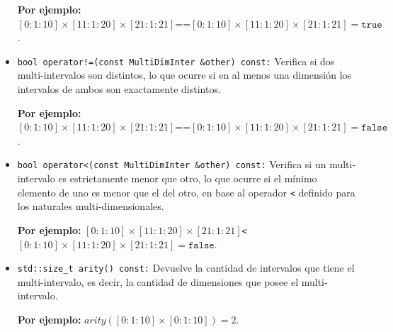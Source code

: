 \begin{itemize}
    \begin{center}
        \textbf{Por ejemplo:} $[0: 1: 10] \times [11: 1: 20] \times [21: 1: 21]\texttt{==}[0: 1: 10] \times [11: 1: 20] \times [21: 1: 21]=\texttt{true}$.
    \end{center}
    
    \item \texttt{bool operator!=(const MultiDimInter \&other) const:}  
    Verifica si dos multi-intervalos son distintos, lo que ocurre si en al menos una dimensión los intervalos de ambos son exactamente distintos.

    \begin{center}
        \textbf{Por ejemplo:} $[0: 1: 10] \times [11: 1: 20] \times [21: 1: 21]\texttt{==}[0: 1: 10] \times [11: 1: 20] \times [21: 1: 21]=\texttt{false}$.
    \end{center}
    
    \item \texttt{bool operator<(const MultiDimInter \&other) const:}  
    Verifica si un multi-intervalo es estrictamente menor que otro, lo que ocurre si el mínimo elemento de uno es menor que el del otro, en base al operador \texttt{<} definido para los naturales multi-dimensionales.

    \begin{center}
        \textbf{Por ejemplo:} $[0: 1: 10] \times [11: 1: 20] \times [21: 1: 21]$\texttt{<}$[0: 1: 10] \times [11: 1: 20] \times [21: 1: 21]=\texttt{false}$.
    \end{center}


    \item \texttt{std::size\_t arity() const:}  
    Devuelve la cantidad de intervalos que tiene el multi-intervalo, es decir, la cantidad de dimensiones que posee el multi-intervalo.
    
    \begin{center}
        \textbf{Por ejemplo:} $arity([0: 1: 10] \times [0: 1: 10])= 2$.
    \end{center}

    

\end{itemize}
